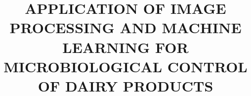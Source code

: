\documentclass[oneside]{normas_pos-utf-tex} %
\title{\MakeUppercase{Application of image processing and machine learning for microbiological control of dairy products}} %
\begin{document}
\renewcommand{\arraystretch}{1.5}

\capa %
\folhaderosto %

\termodeaprovacao



%	

\begin{resumo}
	
\end{resumo}
%
\begin{abstract}
	
\end{abstract}



\sumario %




\setlength{\parskip}{0.0cm}

%
%
%
%
%
%



\clearpage %
\label{bibstart}
\label{bibend}
\end{document}
